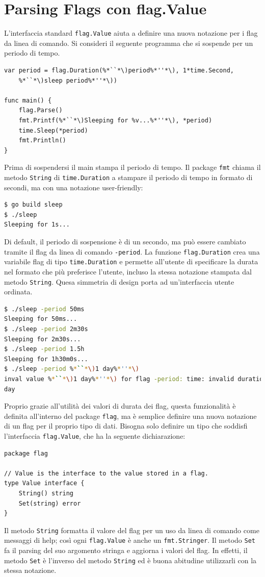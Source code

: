 \section{Parsing Flags con flag.Value}
\label{sec:parsing_flags_con_flagvalue}%
L'interfaccia standard \verb|flag.Value| aiuta a definire una nuova notazione per i flag da linea di comando.
Si consideri il seguente programma che si sospende per un periodo di tempo.
\begin{lstlisting}[frame=single, label={lst:lstlisting6-4.1}]
var period = flag.Duration(%*``*\)period%*''*\), 1*time.Second,
    %*``*\)sleep period%*''*\))

func main() {
    flag.Parse()
    fmt.Printf(%*``*\)Sleeping for %v...%*''*\), *period)
    time.Sleep(*period)
    fmt.Println()
}
\end{lstlisting}
Prima di sospendersi il main stampa il periodo di tempo.
Il package \verb|fmt| chiama il metodo \verb|String| di \verb|time.Duration| a stampare il periodo di tempo in formato di secondi, ma con una notazione user-friendly:
\begin{lstlisting}[language=bash, frame=L, label={lst:lstlisting6-4.2}]
$ go build sleep
$ ./sleep
Sleeping for 1s...
\end{lstlisting}
Di default, il periodo di sospensione è di un secondo, ma può essere cambiato tramite il flag da linea di comando \verb|-period|.
La funzione \verb|flag.Duration| crea una variabile flag di tipo \verb|time.Duration| e permette all'utente di specificare la durata nel formato che più preferisce l'utente, incluso la stessa notazione stampata dal metodo \verb|String|.
Quesa simmetria di design porta ad un'interfaccia utente ordinata.
\begin{lstlisting}[language=bash, frame=L, label={lst:lstlisting6-4.3}]
$ ./sleep -period 50ms
Sleeping for 50ms...
$ ./sleep -period 2m30s
Sleeping for 2m30s...
$ ./sleep -period 1.5h
Sleeping for 1h30m0s...
$ ./sleep -period %*``*\)1 day%*''*\)
inval value %*``*\)1 day%*''*\) for flag -period: time: invalid duration 1
day
\end{lstlisting}
Proprio grazie all'utilità dei valori di durata dei flag, questa funzionalità è definita all'interno del package \verb|flag|, ma è semplice definire una nuova notazione di un flag per il proprio tipo di dati.
Bisogna solo definire un tipo che soddisfi l'interfaccia \verb|flag.Value|, che ha la seguente dichiarazione:
\begin{lstlisting}[frame=single, label={lst:lstlisting6-4.4}]
package flag

// Value is the interface to the value stored in a flag.
type Value interface {
    String() string
    Set(string) error
}
\end{lstlisting}
Il metodo \verb|String| formatta il valore del flag per un uso da linea di comando come messaggi di help;
così ogni \verb|flag.Value| è anche un \verb|fmt.Stringer|.
Il metodo \verb|Set| fa il parsing del suo argomento stringa e aggiorna i valori del flag.
In effetti, il metodo \verb|Set| è l'inverso del metodo \verb|String| ed è buona abitudine utilizzarli con la stessa notazione.

